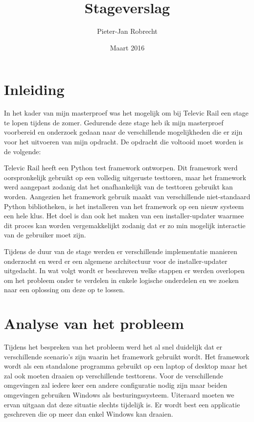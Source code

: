 \documentclass{article}
\title{Stageverslag}
\author{\mbox{Pieter-Jan} Robrecht}
\date{Maart 2016}
\begin{document}


\clearpage
\setcounter{page}{1}

\tableofcontents
\lstlistoflistings
\clearpage

\section{Inleiding}
In het kader van mijn masterproef was het mogelijk om bij Televic Rail een stage te lopen tijdens de zomer. 
Gedurende deze stage heb ik mijn masterproef voorbereid en onderzoek gedaan naar de verschillende mogelijkheden die er zijn voor het uitvoeren van mijn opdracht.
De opdracht die voltooid moet worden is de volgende:

\begin{displayquote}
Televic Rail heeft een Python test framework ontworpen. 
Dit framework werd oorspronkelijk gebruikt op een volledig uitgeruste testtoren, maar het framework werd aangepast zodanig dat het onafhankelijk van de testtoren gebruikt kan worden.
Aangezien het framework gebruik maakt van verschillende niet-standaard Python bibliotheken, is het installeren van het framework op een nieuw systeem een hele klus.
Het doel is dan ook het maken van een installer-updater waarmee dit proces kan worden vergemakkelijkt zodanig dat er zo min mogelijk interactie van de gebruiker moet zijn.
\end{displayquote}

Tijdens de duur van de stage werden er verschillende implementatie manieren onderzocht en werd er een algemene architectuur voor de installer-updater uitgedacht.
In wat volgt wordt er beschreven welke stappen er werden overlopen om het probleem onder te verdelen in enkele logische onderdelen en we zoeken naar een oplossing om deze op te lossen. 

\section{Analyse van het probleem}\label{section:analyse}
Tijdens het bespreken van het probleem werd het al snel duidelijk dat er verschillende scenario's zijn waarin het framework gebruikt wordt. 
Het framework wordt als een standalone programma gebruikt op een laptop of desktop maar het zal ook moeten draaien op verschillende testtorens. 
Voor de verschillende omgevingen zal iedere keer een andere configuratie nodig zijn maar beiden omgevingen gebruiken Windows als besturingssysteem.
Uiteraard moeten we ervan uitgaan dat deze situatie slechts tijdelijk is.
Er wordt best een applicatie geschreven die op meer dan enkel Windows kan draaien.
\end{document}
